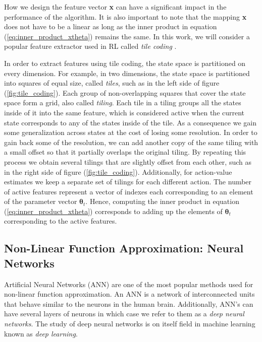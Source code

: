 How we design the feature vector \textbf{x} can have a significant impact in the performance of the algorithm.
It is also important to note that the mapping \textbf{x} does not have to be a linear as long as the inner product in equation (\ref{eq:inner_product_xtheta}) remains the same.
In this work, we will consider a popular feature extractor used in RL called \textit{tile coding} \parencite{Albus71atheory,Albus:1981:BBR:542806,sutton2018}.

In order to extract features using tile coding, the state space is partitioned on every dimension. 
For example, in two dimensions, the state space is partitioned into squares of equal size, called \textit{tiles}, such as in the left side of figure (\ref{fig:tile_coding}).
Each group of non-overlapping squares that cover the state space form a grid, also called \textit{tiling}. 
Each tile in a tiling groups all the states inside of it into the same feature, which is considered active when the current state corresponds to any of the states inside of the tile.
As a consequence we gain some generalization across states at the cost of losing some resolution.
In order to gain back some of the resolution, we can add another copy of the same tiling with a small offset so that it partially overlaps the original tiling.
By repeating this process we obtain several tilings that are slightly offset from each other, such as in the right side of figure (\ref{fig:tile_coding}).
Additionally, for action-value estimates we keep a separate set of tilings for each different action. 
The number of active features represent a vector of indexes each corresponding to an element of the parameter vector $\boldsymbol\theta_t$. 
Hence, computing the inner product in equation (\ref{eq:inner_product_xtheta}) corresponds to adding up the elements of $\boldsymbol\theta_t$ corresponding to the active features.


\subsection{Non-Linear Function Approximation: Neural Networks} 

Artificial Neural Networks (ANN) are one of the most popular methods used for non-linear function approximation.
An ANN is a network of interconnected units that behave similar to the neurons in the human brain.
Additionally, ANN's can have several layers of neurons in which case we refer to them as a \textit{deep neural networks}.
The study of deep neural networks is on itself field in machine learning known as \textit{deep learning}. 

